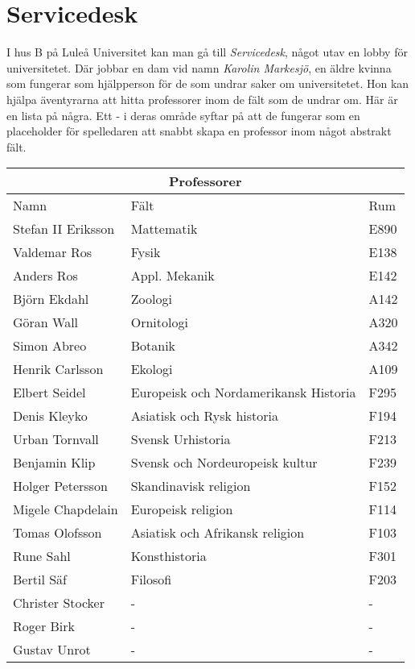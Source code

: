\section{Servicedesk}
\label{loc:Servicedesk}
I hus B på Luleå Universitet kan man gå till \textit{Servicedesk}, något utav en lobby för universitetet. Där jobbar en dam vid namn \textit{Karolin Markesjö}, en äldre kvinna som fungerar som hjälpperson för de som undrar saker om universitetet. Hon kan hjälpa äventyrarna att hitta professorer inom de fält som de undrar om. Här är en lista på några. Ett - i deras område syftar på att de fungerar som en placeholder för spelledaren att snabbt skapa en professor inom något abstrakt fält.

\begin{center}
	\label{tab:Professorer}
	\begin{tabular}{ |p{3cm}|p{3cm}|p{3cm}|  }
		\hline
		\multicolumn{3}{|c|}{Professorer} \\
		\hline
		Namn & Fält & Rum \\ 
		\hline
		Stefan II Eriksson & Mattematik & E890 \\
		Valdemar Ros & Fysik & E138 \\
		Anders Ros & Appl. Mekanik & E142 \\
		Björn Ekdahl & Zoologi & A142 \\
		Göran Wall & Ornitologi & A320 \\
		Simon Abreo & Botanik & A342 \\
		Henrik Carlsson & Ekologi & A109 \\
		Elbert Seidel & Europeisk och Nordamerikansk Historia & F295 \\
		Denis Kleyko & Asiatisk och Rysk historia & F194 \\
		Urban Tornvall & Svensk Urhistoria & F213 \\
		Benjamin Klip & Svensk och Nordeuropeisk kultur & F239 \\
		Holger Petersson & Skandinavisk religion & F152 \\
		Migele Chapdelain & Europeisk religion & F114 \\
		Tomas Olofsson & Asiatisk och Afrikansk religion & F103 \\
		Rune Sahl & Konsthistoria & F301 \\
		Bertil Säf & Filosofi & F203 \\
		Christer Stocker & - & - \\
		Roger Birk & - & - \\
		Gustav Unrot & - & - \\
		\hline
	\end{tabular}
\end{center}

